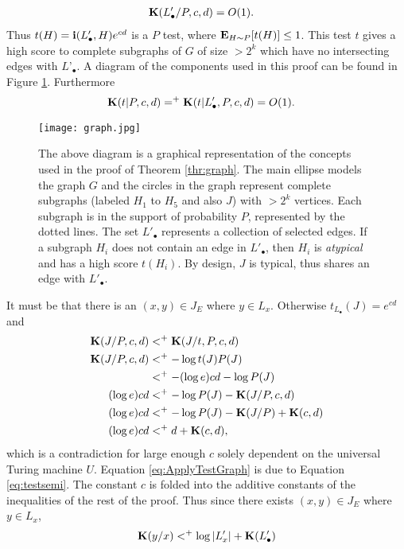\documentclass[11pt]{article}\textwidth 6.5in\textheight 9in
\begin{document}
\begin{prf}
\begin{align}
\label{eq:LSimple}
{\mathbf K}(L'_\bullet/P,c,d)&=O(1). 
\end{align}
Thus $t(H)=\mathbf{i}(L'_\bullet,H)e^{cd}$ is a $P$ test, where ${\mathbf E}_{H\sim P}[t(H)]\leq 1$. This test $t$ gives a high score to complete subgraphs of $G$ of size $>2^k$ which have no intersecting edges with $L’_\bullet$. A diagram of the components used in this proof can be found in Figure \ref{fig:graph}. Furthermore 
	\begin{align*}
	{\mathbf K}(t|P,c,d)&=^+{\mathbf K}(t|L'_\bullet, P,c,d)=O(1).
	\end{align*}
\begin{figure}[t!]      
  \centering
  \texttt{[image: graph.jpg]}
  \caption{The above diagram is a graphical representation of the concepts used in the proof of Theorem \ref{thr:graph}. The main ellipse models the graph $G$ and the circles in the graph represent complete subgraphs (labeled $H_1$ to $H_5$ and also $J$) with $>2^k$ vertices. Each subgraph is in the support of probability $P$, represented by the dotted lines. The set $L'_\bullet$ represents a collection of selected edges. If a subgraph $H_i$ does not contain an edge in $L'_\bullet$, then $H_i$ is \textit{atypical} and has a high score $t(H_i)$. By design, $J$ is typical, thus shares an edge with $L'_\bullet$.}
  \label{fig:graph}
\end{figure}It must be that there is an $(x,y)\in J_E$ where $y\in L_x$. Otherwise $t_{L_\bullet}(J)=e^{cd}$ and 
	\begin{align}
	\nonumber
	{\mathbf K}(J/P,c,d) &<^+ {\mathbf K}(J/t,P,c,d)\\
	\label{eq:ApplyTestGraph}
	{\mathbf K}(J/P,c,d) &<^+ -\log t(J)P(J)\\
	\nonumber
	&<^+ -(\log e) cd-\log P(J)\\
	\nonumber
	(\log e) cd&<^+ -\log P(J)  - {\mathbf K}(J/P,c,d)\\
	\nonumber
	(\log e) cd&<^+ -\log P(J)  - {\mathbf K}(J/P)+{\mathbf K}(c,d)\\
	\nonumber
	(\log e) cd&<^+ d+{\mathbf K}(c,d),
	\end{align}
	which is a contradiction for large enough $c$ solely dependent on the universal Turing machine $U$. Equation \ref{eq:ApplyTestGraph} is due to Equation \ref{eq:testsemi}. The constant $c$ is folded into the additive constants of the inequalities of the rest of the proof. Thus since there exists $(x,y)\in J_E$ where $y\in L_x$,
	\begin{align}
	\nonumber
	\K(y/x) &\lea \log |L'_x|+\K(L'_\bullet)\\

\end{align}
\end{prf}
\end{document}
